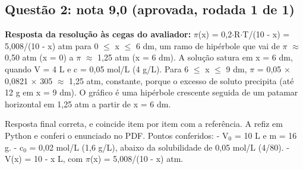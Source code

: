 \documentclass{article}%
\begin{document}
\subsection*{Questão 2: nota 9,0 (aprovada, rodada 1 de 1)}%
\textbf{Resposta da resolução às cegas do avaliador:} $\pi$(x) = 0,2$\cdot$R$\cdot$T/(10 - x) = 5,008/(10 - x) atm para 0 $\leq$ x $\leq$ 6 dm, um ramo de hipérbole que vai de $\pi$ $\approx$ 0,50 atm (x = 0) a $\pi$ $\approx$ 1,25 atm (x = 6 dm). A solução satura em x = 6 dm, quando V = 4 L e c = 0,05 mol/L (4 g/L). Para 6 $\leq$ x $\leq$ 9 dm, $\pi$ = 0,05 $\times$ 0,0821 $\times$ 305 $\approx$ 1,25 atm, constante, porque o excesso de soluto precipita (até 12 g em x = 9 dm). O gráfico é uma hipérbole crescente seguida de um patamar horizontal em 1,25 atm a partir de x = 6 dm.\par %
Resposta final correta, e coincide item por item com a referência. A refiz em Python e conferi o enunciado no PDF.\newline%
\newline%
Pontos conferidos:\newline%
{-} V$_{0}$ = 10 L e m = 16 g.\newline%
{-} c$_{0}$ = 0,02 mol/L (1,6 g/L), abaixo da solubilidade de 0,05 mol/L (4/80).\newline%
{-} V(x) = 10 - x L, com $\pi$(x) = 5,008/(10 - x) atm.\newline%
\end{document}
